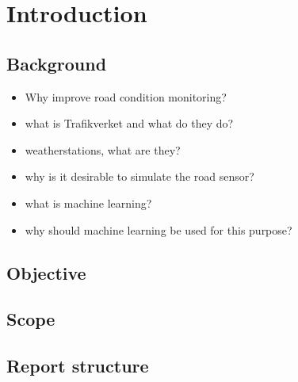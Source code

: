 \chapter{Introduction}
\section{Background}
\begin{itemize}
	\item Why improve road condition monitoring?
	\item what is Trafikverket and what do they do? 
	\item weatherstations, what are they? 
	\item why is it desirable to simulate the road sensor?
	\item what is machine learning?
	\item why should machine learning be used for this purpose?
\end{itemize}

\section{Objective}
	
\section{Scope}

\section{Report structure}
